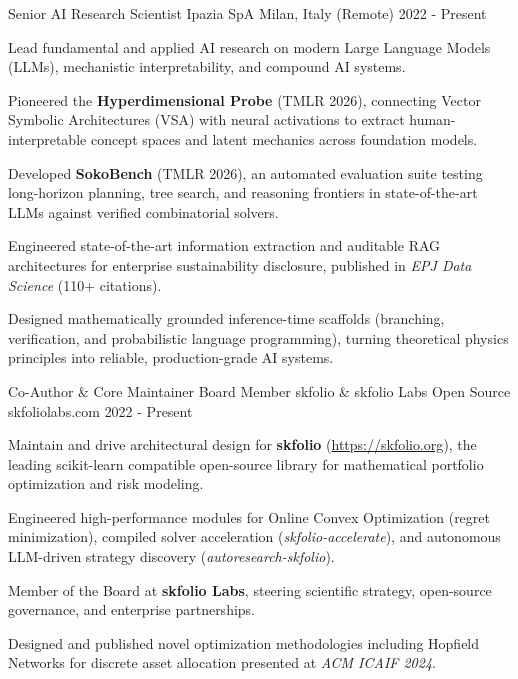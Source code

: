 \documentclass[11pt, a4paper]{awesome-cv}
\begin{document}
\begin{cventries}

\cventry
{Senior AI Research Scientist} {Ipazia SpA} {Milan, Italy (Remote)} {2022 - Present} { \begin{cvitems}
\item{Lead fundamental and applied AI research on modern Large Language Models (LLMs), mechanistic interpretability, and compound AI systems.}
\item{Pioneered the \textbf{Hyperdimensional Probe} (TMLR 2026), connecting Vector Symbolic Architectures (VSA) with neural activations to extract human-interpretable concept spaces and latent mechanics across foundation models.}
\item{Developed \textbf{SokoBench} (TMLR 2026), an automated evaluation suite testing long-horizon planning, tree search, and reasoning frontiers in state-of-the-art LLMs against verified combinatorial solvers.}
\item{Engineered state-of-the-art information extraction and auditable RAG architectures for enterprise sustainability disclosure, published in \textit{EPJ Data Science} (110+ citations).}
\item{Designed mathematically grounded inference-time scaffolds (branching, verification, and probabilistic language programming), turning theoretical physics principles into reliable, production-grade AI systems.}
\end{cvitems}
}

\cventry
{Co-Author \& Core Maintainer \textbar{} Board Member} {skfolio \& skfolio Labs} {Open Source \textbar{} skfoliolabs.com} {2022 - Present} { \begin{cvitems}
\item{Maintain and drive architectural design for \textbf{skfolio} (\url{https://skfolio.org}), the leading scikit-learn compatible open-source library for mathematical portfolio optimization and risk modeling.}
\item{Engineered high-performance modules for Online Convex Optimization (regret minimization), compiled solver acceleration (\textit{skfolio-accelerate}), and autonomous LLM-driven strategy discovery (\textit{autoresearch-skfolio}).}
\item{Member of the Board at \textbf{skfolio Labs}, steering scientific strategy, open-source governance, and enterprise partnerships.}
\item{Designed and published novel optimization methodologies including Hopfield Networks for discrete asset allocation presented at \textit{ACM ICAIF 2024}.}
\end{cvitems}
}


\end{cventries}
\end{document}
